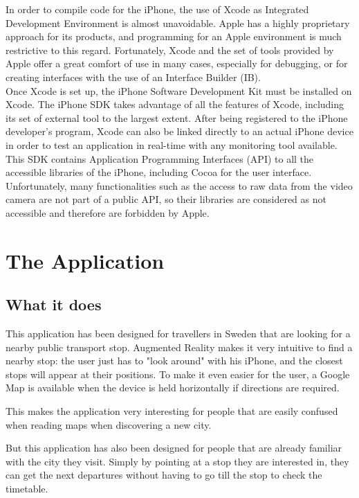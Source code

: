 In order to compile code for the iPhone, the use of Xcode as Integrated Development Environment is almost unavoidable. Apple has a highly proprietary approach for its products, and programming for an Apple environment is much restrictive to this regard. Fortunately, Xcode and the set of tools provided by Apple offer a great comfort of use in many cases, especially for debugging, or for creating interfaces with the use of an Interface Builder (IB).\\

Once Xcode is set up, the iPhone Software Development Kit must be installed on Xcode. The iPhone SDK takes advantage of all the features of Xcode, including its set of external tool to the largest extent. After being registered to the iPhone developer's program, Xcode can also be linked directly to an actual iPhone device in order to test an application in real-time with any monitoring tool available.\\

This SDK contains Application Programming Interfaces (API) to all the accessible libraries of the iPhone, including Cocoa for the user interface. Unfortunately, many functionalities such as the access to raw data from the video camera are not part of a public API, so their libraries are considered as not accessible and therefore are forbidden by Apple.

\section{The Application}
\label{sec:the_application}

\subsection{What it does}

This application has been designed for travellers in Sweden that are looking for a nearby public transport stop. Augmented Reality makes it very intuitive to find a nearby stop: the user just has to "look around" with his iPhone, and the closest stops will appear at their positions. To make it even easier for the user, a Google Map is available when the device is held horizontally if directions are required. 

This makes the application very interesting for people that are easily confused when reading maps when discovering a new city.

But this application has also been designed for people that are already familiar with the city they visit. Simply by pointing at a stop they are interested in, they can get the next departures without having to go till the stop to check the timetable.

